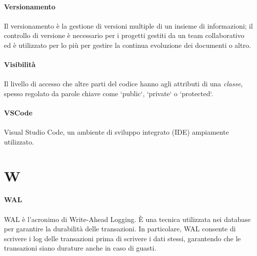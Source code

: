 \documentclass[10pt, a4paper]{article}
\begin{document}
\vspace{2em}
\paragraph{Versionamento}\noindent\hrulefill
\paragraph{}Il versionamento è la gestione di versioni multiple di un insieme di informazioni; il controllo di versione è necessario
per i progetti gestiti da un team collaborativo ed è utilizzato per lo più per gestire la continua evoluzione dei documenti o altro.

\vspace{2em}
\paragraph{Visibilità}\noindent\hrulefill
\paragraph{}Il livello di accesso che altre parti del codice hanno agli attributi di una \textit{classe\pg}, spesso regolato da parole chiave come `public`, `private` o `protected`.

\vspace{2em}
\paragraph{VSCode}\noindent\hrulefill
\paragraph{}Visual Studio Code, un ambiente di sviluppo integrato (IDE) ampiamente utilizzato.


\newpage
\section{W}

\vspace{2em}
\paragraph{WAL}\noindent\hrulefill
\paragraph{}WAL è l'acronimo di Write-Ahead Logging. È una tecnica utilizzata nei database per garantire la durabilità delle transazioni. In particolare, WAL consente di scrivere i log delle transazioni prima di scrivere i dati stessi, garantendo che le transazioni siano durature anche in caso di guasti.
\end{document}
